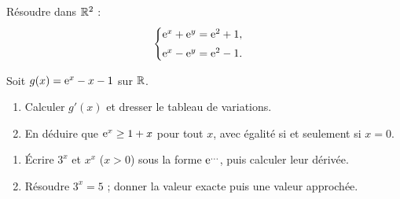 Résoudre dans $\mathbb{R}^{2}$ :
\[
\begin{cases}
	\mathrm{e}^{x}+\mathrm{e}^{y}=\mathrm{e}^{2}+1,\\[0.3em]
	\mathrm{e}^{x}-\mathrm{e}^{y}=\mathrm{e}^{2}-1.
\end{cases}
\]

Soit $g(x)=\mathrm{e}^{x}-x-1$ sur $\mathbb{R}$.
\begin{enumerate}
	\item Calculer $g'(x)$ et dresser le tableau de variations.
	\item En déduire que $\mathrm{e}^{x}\geq 1+x$ pour tout $x$, avec égalité si et
	seulement si $x=0$.
\end{enumerate}

\begin{enumerate}
	\item Écrire $3^{x}$ et $x^{x}$ ($x>0$) sous la forme $\mathrm{e}^{\ldots}$, puis
	calculer leur dérivée.
	\item Résoudre $3^{x}=5$ ; donner la valeur exacte puis une valeur
	approchée.
\end{enumerate}
